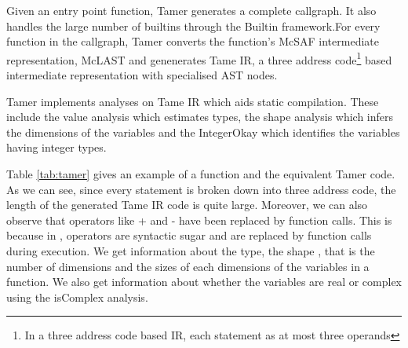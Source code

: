 Given an entry point function, Tamer generates a complete callgraph. It also handles the large number of \matlab builtins through the Builtin framework.For every function in the callgraph, Tamer converts the function's McSAF intermediate representation, McLAST and genenerates Tame IR, a three address code\footnote{In a three address code based IR, each statement as at most three operands} based intermediate representation with specialised AST nodes. 

Tamer implements analyses on Tame IR which aids static compilation. These include the value analysis\cite{Dubrau:2012} which estimates \matlab types, the shape analysis\cite{Li:2014} which infers the dimensions of the variables and the IntegerOkay\cite{vkumar14} which identifies the variables having integer types. 

Table \ref{tab:tamer} gives an example of a \matlab function and the equivalent Tamer code. As we can see, since every statement is broken down into three address code, the length of the generated Tame IR code is quite large. Moreover, we can also observe that operators like \textsf{+} and \textsf{-} have been replaced by function calls. This is because in \matlab, operators are syntactic sugar and are replaced by function calls during execution. We get information about the type, the shape , that is the number of dimensions and the sizes of each dimensions of the variables in a function. We also get information about whether the variables are real or complex using the isComplex analysis\cite{iscmplx}. 

